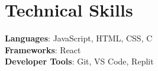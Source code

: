 \documentclass[letterpaper,11pt]{article}
\begin{document}
%
\section{Technical Skills}
 \begin{itemize}[leftmargin=0.15in, label={}]
    \small{\item{
     \textbf{Languages}{: JavaScript, HTML, CSS, C} \\
     \textbf{Frameworks}{: React} \\
     \textbf{Developer Tools}{: Git, VS Code, Replit} \\
    }}
 \end{itemize}


\end{document}
